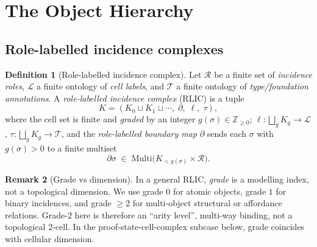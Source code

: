 \documentclass[11pt]{article}
\theoremstyle{definition}
\newtheorem{definition}{Definition}[section]
\newtheorem{remark}[definition]{Remark}
\theoremstyle{plain}
\newcommand{\Z}{\mathbb{Z}}
\newcommand{\Multi}{\mathrm{Multi}}
\begin{document}
\section{The Object Hierarchy}\label{sec:hierarchy}

\subsection{Role-labelled incidence complexes}

\begin{definition}[Role-labelled incidence complex]\label{def:rlic}
Let $\mathcal{R}$ be a finite set of \emph{incidence roles}, $\mathcal{L}$ a finite ontology of \emph{cell labels}, and $\mathcal{T}$ a finite ontology of \emph{type/foundation annotations}. A \emph{role-labelled incidence complex} (RLIC) is a tuple
\[
K = (K_0 \sqcup K_1 \sqcup \cdots,\; \partial,\; \ell,\; \tau),
\]
where the cell set is finite and \emph{graded} by an integer $g(\sigma) \in \Z_{\ge 0}$; $\ell\colon \bigsqcup_g K_g \to \mathcal{L}$, $\tau\colon \bigsqcup_g K_g \to \mathcal{T}$, and the \emph{role-labelled boundary map} $\partial$ sends each $\sigma$ with $g(\sigma) > 0$ to a finite multiset
\[
\partial \sigma \;\in\; \Multi\bigl(K_{<g(\sigma)} \times \mathcal{R}\bigr).
\]
\end{definition}

\begin{remark}[Grade vs dimension]\label{rem:grade}
In a general RLIC, \emph{grade} is a modelling index, not a topological dimension. We use grade $0$ for atomic objects, grade $1$ for binary incidences, and grade $\ge 2$ for multi-object structural or affordance relations. Grade-$2$ here is therefore an ``arity level'', multi-way binding, not a topological 2-cell. In the proof-state-cell-complex subcase below, grade coincides with cellular dimension.
\end{remark}
\end{document}
